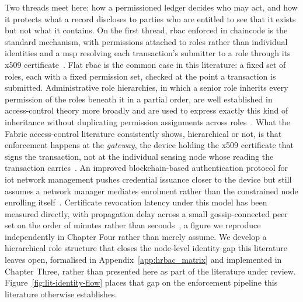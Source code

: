\documentclass[12pt,a4paper,oneside]{book}
\begin{document}
\label{subsec:lit_privacy}

Two threads meet here: how a permissioned ledger decides who may act, and
how it protects what a record discloses to parties who are entitled to see
that it exists but not what it contains. On the first thread, \gls{rbac}
enforced in chaincode is the standard mechanism, with permissions attached
to roles rather than individual identities and a \gls{msp} resolving each
transaction's submitter to a role through its
\gls{x509} certificate~\cite{mdpiAccessControl, hyperledger2022msp}. Flat
\gls{rbac} is the common case in this literature: a fixed set of roles,
each with a fixed permission set, checked at the point a transaction is
submitted. Administrative role hierarchies, in which a senior role
inherits every permission of the roles beneath it in a partial order, are
well established in access-control theory more broadly and are used to
express exactly this kind of inheritance without duplicating permission
assignments across roles~\cite{lu2022revocation}. What the Fabric
access-control literature consistently shows, hierarchical or not, is that
enforcement happens at the \emph{gateway}, the device holding the
\gls{x509} certificate that signs the transaction, not at the individual
sensing node whose reading the transaction
carries~\cite{mdpiAccessControl, yavari2020blockchain}. An improved
blockchain-based authentication protocol for \gls{iot} network management
pushes credential issuance closer to the device but still assumes a
network manager mediates enrolment rather than the constrained node
enrolling itself~\cite{yavari2020blockchain}. Certificate revocation
latency under this model has been measured directly, with propagation
delay across a small gossip-connected peer set on the order of minutes
rather than seconds~\cite{lu2022revocation}, a figure we reproduce
independently in Chapter Four rather than merely assume. We develop a
hierarchical role structure that closes the node-level identity gap this
literature leaves open, formalised in Appendix~\ref{app:hrbac_matrix} and
implemented in Chapter Three, rather than presented here as part of the
literature under review. Figure~\ref{fig:lit-identity-flow} places that
gap on the enforcement pipeline this literature otherwise establishes.
\end{document}
